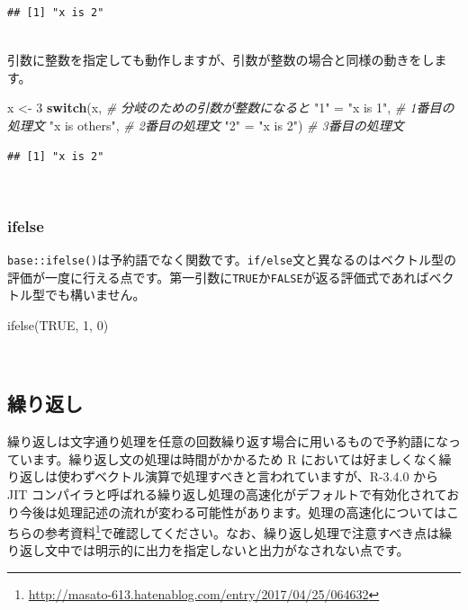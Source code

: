 \documentclass[
  12pt,
]{book}
\newenvironment{Shaded}{\begin{snugshade}}{\end{snugshade}}
\newcommand{\CommentTok}[1]{\textcolor[rgb]{0.56,0.35,0.01}{\textit{#1}}}
\newcommand{\ConstantTok}[1]{\textcolor[rgb]{0.00,0.00,0.00}{#1}}
\newcommand{\ControlFlowTok}[1]{\textcolor[rgb]{0.13,0.29,0.53}{\textbf{#1}}}
\newcommand{\DecValTok}[1]{\textcolor[rgb]{0.00,0.00,0.81}{#1}}
\newcommand{\FunctionTok}[1]{\textcolor[rgb]{0.00,0.00,0.00}{#1}}
\newcommand{\NormalTok}[1]{#1}
\newcommand{\OtherTok}[1]{\textcolor[rgb]{0.56,0.35,0.01}{#1}}
\newcommand{\StringTok}[1]{\textcolor[rgb]{0.31,0.60,0.02}{#1}}
\DeclareRobustCommand{\href}[2]{#2\footnote{\url{#1}}}
\begin{document}
\begin{verbatim}
## [1] "x is 2"
\end{verbatim}

　\\
引数に整数を指定しても動作しますが、引数が整数の場合と同様の動きをします。

\begin{Shaded}
\begin{Highlighting}[numbers=left,,]
\NormalTok{x }\OtherTok{\textless{}{-}} \DecValTok{3}
\ControlFlowTok{switch}\NormalTok{(x,                 }\CommentTok{\# 分岐のための引数が整数になると}
       \StringTok{"1"} \OtherTok{=} \StringTok{"x is 1"}\NormalTok{,    }\CommentTok{\# 1番目の処理文}
       \StringTok{"x is others"}\NormalTok{,     }\CommentTok{\# 2番目の処理文}
       \StringTok{"2"} \OtherTok{=} \StringTok{"x is 2"}\NormalTok{)    }\CommentTok{\# 3番目の処理文}
\end{Highlighting}
\end{Shaded}

\begin{verbatim}
## [1] "x is 2"
\end{verbatim}

　

\hypertarget{ifelse}{%
\subsubsection{ifelse}\label{ifelse}}

\texttt{base::ifelse()}は予約語でなく関数です。\texttt{if/else}文と異なるのはベクトル型の評価が一度に行える点です。第一引数に\texttt{TRUE}か\texttt{FALSE}が返る評価式であればベクトル型でも構いません。

\begin{Shaded}
\begin{Highlighting}[numbers=left,,]
\FunctionTok{ifelse}\NormalTok{(}\ConstantTok{TRUE}\NormalTok{, }\DecValTok{1}\NormalTok{, }\DecValTok{0}\NormalTok{)}
\end{Highlighting}
\end{Shaded}

　

\hypertarget{ux7e70ux308aux8fd4ux3057}{%
\subsection{繰り返し}\label{ux7e70ux308aux8fd4ux3057}}

繰り返しは文字通り処理を任意の回数繰り返す場合に用いるもので予約語になっています。繰り返し文の処理は時間がかかるため R においては好ましくなく繰り返しは使わずベクトル演算で処理すべきと言われていますが、R-3.4.0 から JIT コンパイラと呼ばれる繰り返し処理の高速化がデフォルトで有効化されており今後は処理記述の流れが変わる可能性があります。処理の高速化についてはこちらの\href{http://masato-613.hatenablog.com/entry/2017/04/25/064632}{参考資料}で確認してください。なお、繰り返し処理で注意すべき点は繰り返し文中では明示的に出力を指定しないと出力がなされない点です。
\end{document}
